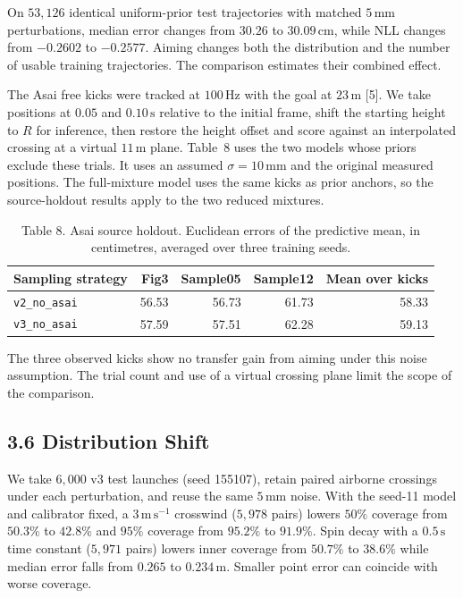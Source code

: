 On $53{,}126$ identical uniform-prior test trajectories with matched $5\,\mathrm{mm}$ perturbations, median error changes from $30.26$ to $30.09\,\mathrm{cm}$, while NLL changes from $-0.2602$ to $-0.2577$. Aiming changes both the distribution and the number of usable training trajectories. The comparison estimates their combined effect.

The Asai free kicks were tracked at $100\,\mathrm{Hz}$ with the goal at $23\,\mathrm{m}$ [5]. We take positions at $0.05$ and $0.10\,\mathrm{s}$ relative to the initial frame, shift the starting height to $R$ for inference, then restore the height offset and score against an interpolated crossing at a virtual $11\,\mathrm{m}$ plane. Table~8 uses the two models whose priors exclude these trials. It uses an assumed $\sigma=10\,\mathrm{mm}$ and the original measured positions. The full-mixture model uses the same kicks as prior anchors, so the source-holdout results apply to the two reduced mixtures.

\begin{table}[htbp]
  
  
  \caption{Table 8. Asai source holdout. Euclidean errors of the predictive mean, in centimetres, averaged over three training seeds.}
  \begin{tabular}{lrrrr}
    \toprule
    Sampling strategy & Fig3 & Sample05 & Sample12 & Mean over kicks \\
    \midrule
    \texttt{v2\_no\_asai} & 56.53 & 56.73 & 61.73 & 58.33 \\
    \texttt{v3\_no\_asai} & 57.59 & 57.51 & 62.28 & 59.13 \\
    \bottomrule
  \end{tabular}
\end{table}

The three observed kicks show no transfer gain from aiming under this noise assumption. The trial count and use of a virtual crossing plane limit the scope of the comparison.

\subsection{3.6 Distribution Shift}

We take $6{,}000$ v3 test launches (seed 155107), retain paired airborne crossings under each perturbation, and reuse the same $5\,\mathrm{mm}$ noise. With the seed-11 model and calibrator fixed, a $3\,\mathrm{m\,s^{-1}}$ crosswind ($5{,}978$ pairs) lowers $50\%$ coverage from $50.3\%$ to $42.8\%$ and $95\%$ coverage from $95.2\%$ to $91.9\%$. Spin decay with a $0.5\,\mathrm{s}$ time constant ($5{,}971$ pairs) lowers inner coverage from $50.7\%$ to $38.6\%$ while median error falls from $0.265$ to $0.234\,\mathrm{m}$. Smaller point error can coincide with worse coverage.

